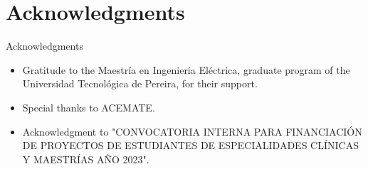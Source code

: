 \documentclass[10pt, xcolor=table]{beamer}
\let\olditem\item
\renewcommand\item{\olditem\justifying}
\begin{document}
\section*{Acknowledgments}
\begin{frame}{Acknowledgments}
	\begin{itemize}
		\item Gratitude to the Maestría en Ingeniería Eléctrica, graduate program of the Universidad Tecnológica de Pereira, for their support.
		
		\item Special thanks to ACEMATE.
		
		\item Acknowledgment to "CONVOCATORIA INTERNA PARA FINANCIACIÓN DE PROYECTOS DE ESTUDIANTES DE ESPECIALIDADES CLÍNICAS Y MAESTRÍAS AÑO 2023".
	\end{itemize}
\end{frame}




	
\end{document}
